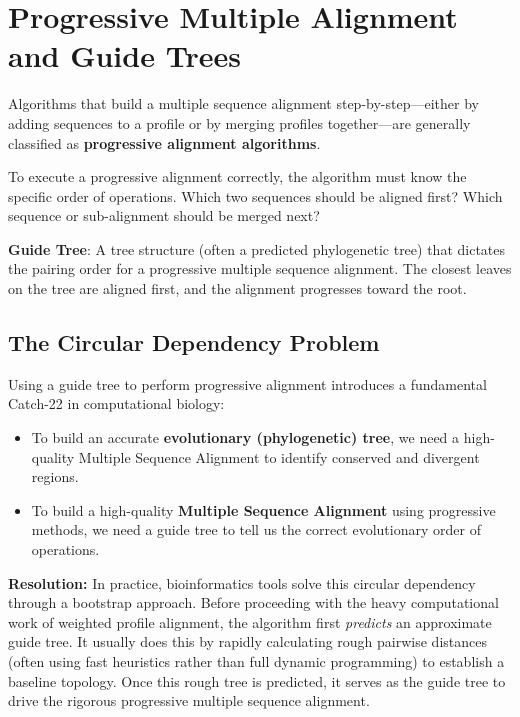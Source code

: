 \section{Progressive Multiple Alignment and Guide Trees}

Algorithms that build a multiple sequence alignment step-by-step—either by adding sequences to a profile or by merging profiles together—are generally classified as \textbf{progressive alignment algorithms}.

To execute a progressive alignment correctly, the algorithm must know the specific order of operations. Which two sequences should be aligned first? Which sequence or sub-alignment should be merged next?

\begin{important}
    \textbf{Guide Tree}: A tree structure (often a predicted phylogenetic tree) that dictates the pairing order for a progressive multiple sequence alignment. The closest leaves on the tree are aligned first, and the alignment progresses toward the root.
\end{important}

\subsection{The Circular Dependency Problem}

Using a guide tree to perform progressive alignment introduces a fundamental Catch-22 in computational biology:
\begin{itemize}
        \item To build an accurate \textbf{evolutionary (phylogenetic) tree}, we need a high-quality Multiple Sequence Alignment to identify conserved and divergent regions.
        \item To build a high-quality \textbf{Multiple Sequence Alignment} using progressive methods, we need a guide tree to tell us the correct evolutionary order of operations.
\end{itemize}

\sta \textbf{Resolution:} In practice, bioinformatics tools solve this circular dependency through a bootstrap approach. Before proceeding with the heavy computational work of weighted profile alignment, the algorithm first \textit{predicts} an approximate guide tree. It usually does this by rapidly calculating rough pairwise distances (often using fast heuristics rather than full dynamic programming) to establish a baseline topology. Once this rough tree is predicted, it serves as the guide tree to drive the rigorous progressive multiple sequence alignment.


